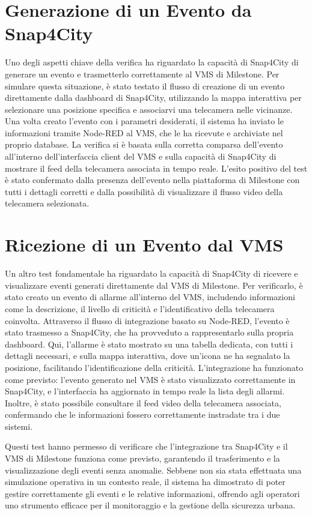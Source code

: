 \documentclass[a4paper, openright, thesis]{report}
\begin{document}
\section{Generazione di un Evento da Snap4City}
Uno degli aspetti chiave della verifica ha riguardato la capacità di Snap4City di generare un evento e trasmetterlo correttamente al VMS di Milestone. Per simulare questa situazione, è stato testato il flusso di creazione di un evento direttamente dalla dashboard di Snap4City, utilizzando la mappa interattiva per selezionare una posizione specifica e associarvi una telecamera nelle vicinanze. Una volta creato l’evento con i parametri desiderati, il sistema ha inviato le informazioni tramite Node-RED al VMS, che le ha ricevute e archiviate nel proprio database. La verifica si è basata sulla corretta comparsa dell’evento all’interno dell’interfaccia client del VMS e sulla capacità di Snap4City di mostrare il feed della telecamera associata in tempo reale. L’esito positivo del test è stato confermato dalla presenza dell’evento nella piattaforma di Milestone con tutti i dettagli corretti e dalla possibilità di visualizzare il flusso video della telecamera selezionata.

\section{Ricezione di un Evento dal VMS}
Un altro test fondamentale ha riguardato la capacità di Snap4City di ricevere e visualizzare eventi generati direttamente dal VMS di Milestone. Per verificarlo, è stato creato un evento di allarme all'interno del VMS, includendo informazioni come la descrizione, il livello di criticità e l’identificativo della telecamera coinvolta. Attraverso il flusso di integrazione basato su Node-RED, l’evento è stato trasmesso a Snap4City, che ha provveduto a rappresentarlo sulla propria dashboard. Qui, l’allarme è stato mostrato su una tabella dedicata, con tutti i dettagli necessari, e sulla mappa interattiva, dove un’icona ne ha segnalato la posizione, facilitando l’identificazione della criticità. L’integrazione ha funzionato come previsto: l’evento generato nel VMS è stato visualizzato correttamente in Snap4City, e l’interfaccia ha aggiornato in tempo reale la lista degli allarmi. Inoltre, è stato possibile consultare il feed video della telecamera associata, confermando che le informazioni fossero correttamente instradate tra i due sistemi.

Questi test hanno permesso di verificare che l’integrazione tra Snap4City e il VMS di Milestone funziona come previsto, garantendo il trasferimento e la visualizzazione degli eventi senza anomalie. Sebbene non sia stata effettuata una simulazione operativa in un contesto reale, il sistema ha dimostrato di poter gestire correttamente gli eventi e le relative informazioni, offrendo agli operatori uno strumento efficace per il monitoraggio e la gestione della sicurezza urbana.
\end{document}
